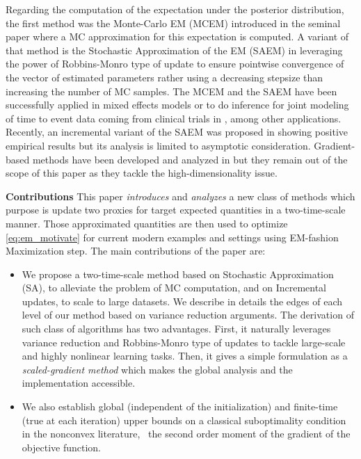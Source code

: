 \documentclass[11pt]{article}
\theoremstyle{t}
\begin{document}
Regarding the computation of the expectation under the posterior distribution, the first method was the Monte-Carlo EM (MCEM) introduced in the seminal paper \citep{wei1990monte} where a MC approximation for this expectation is computed. A variant of that method is the Stochastic Approximation of the EM (SAEM) in \citep{delyon1999} leveraging the power of Robbins-Monro type of update \citep{robbins1951stochastic} to ensure pointwise convergence of the vector of estimated parameters rather using a decreasing stepsize than increasing the number of MC samples.
The MCEM and the SAEM have been successfully applied in mixed effects models \citep{mcculloch1997maximum,hughes1999mixed,baey2016nonlinear} or to do inference for joint modeling of time to event data coming from clinical trials in \citep{das2010Inferences}, among other applications.
Recently, an incremental variant of the SAEM was proposed in \citep{kuhn2019properties} showing positive empirical results but its analysis is limited to asymptotic consideration. 
Gradient-based methods have been developed and analyzed in \citep{zhu2017high} but they remain out of the scope of this paper as they tackle the high-dimensionality issue.

\textbf{Contributions} This paper \textit{introduces} and \textit{analyzes} a new class of methods which purpose is update two proxies for target expected quantities in a two-time-scale manner. 
Those approximated quantities are then used to optimize \eqref{eq:em_motivate} for current modern examples and settings using EM-fashion \textsf{Maximization} step.
The main contributions of the paper are:
\begin{itemize}
\item We propose a two-time-scale method based on Stochastic Approximation (SA), to alleviate the problem of MC computation, and on Incremental updates, to scale to large datasets. We describe in details the edges of each level of our method based on variance reduction arguments. The derivation of such class of algorithms has two advantages. First, it naturally leverages variance reduction and Robbins-Monro type of updates to tackle large-scale and highly nonlinear learning tasks. Then, it gives a simple formulation as a \textit{scaled-gradient method} which makes the global analysis and the implementation accessible.
\item We also establish global (independent of the initialization) and finite-time (true at each iteration) upper bounds on a classical suboptimality condition in the nonconvex literature, \ie\ the second order moment of the gradient of the objective function. 
\end{itemize}
\end{document}
